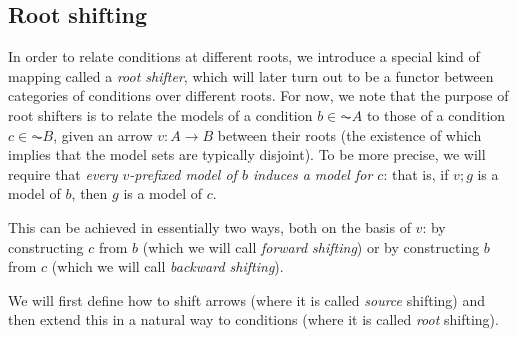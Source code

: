 \subsection{Root shifting}

In order to relate conditions at different roots, we introduce a special kind of mapping called a \emph{root shifter}, which will later turn out to be a functor between categories of conditions over different roots. For now, we note that the purpose of root shifters is to relate the models of a condition $b\in \AC A$ to those of a condition $c\in \AC B$, given an arrow $v:A\to B$ between their roots (the existence of which implies that the model sets are typically disjoint). To be more precise, we will require that \emph{every $v$-prefixed model of $b$ induces a model for $c$}: that is, if $v;g$ is a model of $b$, then $g$ is a model of $c$.

This can be achieved in essentially two ways, both on the basis of $v$: by constructing $c$ from $b$ (which we will call \emph{forward shifting}) or by constructing $b$ from $c$ (which we will call \emph{backward shifting}).

We will first define how to shift arrows (where it is called \emph{source} shifting) and then extend this in a natural way to conditions (where it is called \emph{root} shifting).

